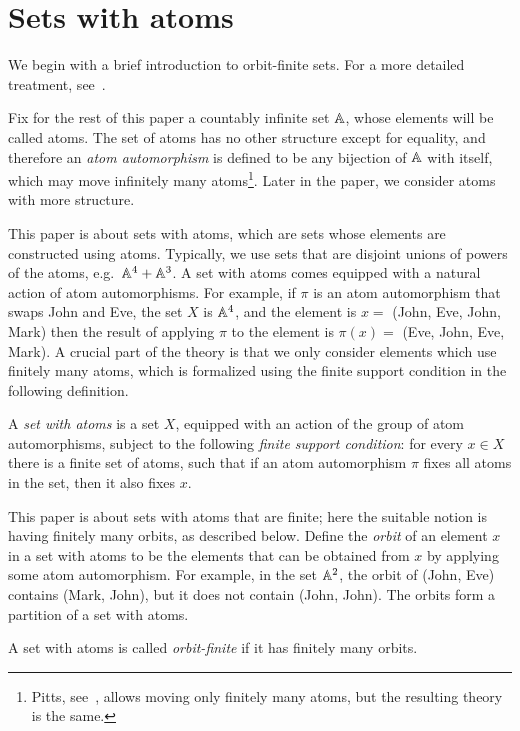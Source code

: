 \section{Sets with atoms}
We begin  with  a brief introduction to orbit-finite sets. For a more detailed treatment, see~\cite{bojanczyk_slightly2018}.

Fix for the rest of this paper a countably infinite set $\mathbb A$, whose elements will be called atoms. The set of atoms has no other structure except for equality, and therefore an \emph{atom automorphism} is defined to be any bijection of $\mathbb A$ with itself, which may move infinitely many atoms\footnote{Pitts, see~\cite[Definition 1.13]{PittsAM:nomsns}, allows moving only finitely many atoms, but the resulting theory is the same.}. Later in the paper, we  consider atoms with more structure.

This paper is about sets with atoms, which are sets whose elements are constructed using atoms. Typically, we use sets that are disjoint unions of powers of the atoms, e.g.~$\mathbb A^4 + \mathbb A^3$. A set with atoms comes equipped with a natural action of atom automorphisms. For example, if $\pi$ is an atom automorphism that swaps John and Eve, the set $X$ is $\mathbb A^4$, and the element is  $x=$ (John, Eve, John, Mark) then the result of applying $\pi$ to the element is $\pi(x)=$ (Eve, John, Eve, Mark).  A crucial part of the theory is that we only consider elements which use finitely many atoms, which is formalized using the finite support condition in the following definition.

\begin{definition}
    A \emph{set with atoms} is a set $X$, equipped with an action of the group of atom automorphisms, subject to the following \emph{finite support condition}: for every $x \in X$ there is a finite set of atoms, such that if an atom automorphism $\pi$ fixes all atoms in the set, then it also fixes $x$.
\end{definition}
    
This paper is about sets with atoms that are finite; here the suitable notion is having finitely many orbits, as described below.
Define the \emph{orbit} of an element $x$ in a set with atoms to be the elements that can be obtained from $x$ by applying some atom automorphism. For example, in the set $\mathbb A^2$,  the orbit of (John, Eve)   contains  (Mark, John), but it does not contain (John, John). The orbits form a partition of a set with atoms. 


\begin{definition}   A set with atoms is called \emph{orbit-finite} if it has finitely many orbits. 
\end{definition}

